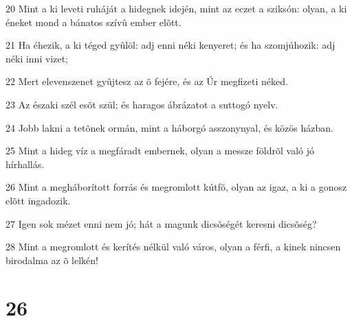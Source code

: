 \par 20 Mint a ki leveti ruháját a hidegnek idején, mint az eczet a sziksón: olyan, a ki éneket mond a bánatos szívû ember elõtt.
\par 21 Ha éhezik, a ki téged gyûlöl: adj enni néki kenyeret; és ha szomjúhozik: adj néki inni vizet;
\par 22 Mert elevenszenet gyûjtesz az õ fejére, és az Úr megfizeti néked.
\par 23 Az északi szél esõt szül; és haragos ábrázatot a suttogó nyelv.
\par 24 Jobb lakni a tetõnek ormán, mint a háborgó asszonynyal, és közös házban.
\par 25 Mint a hideg víz a megfáradt embernek, olyan a messze földrõl való jó hírhallás.
\par 26 Mint a megháborított forrás és megromlott kútfõ, olyan az igaz, a ki a gonosz elõtt ingadozik.
\par 27 Igen sok mézet enni nem jó; hát a magunk dicsõségét keresni dicsõség?
\par 28 Mint a megromlott és kerítés nélkül való város, olyan a férfi, a kinek nincsen birodalma az õ lelkén!

\chapter{26}

